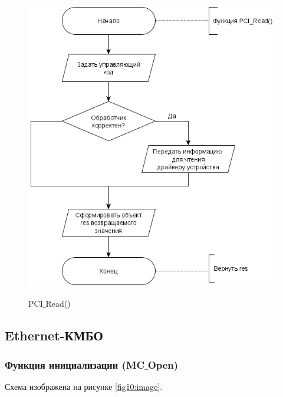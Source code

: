 	\begin{figure}[ph!]
		\centering
		\begin{center}
			{\includegraphics[scale=0.5]{schemes/pci_read.png}}
			\caption{PCI$\_$Read()}
			\label{fig9:image}
		\end{center}
	\end{figure}

	\subsection{Ethernet-КМБО}
	\subsubsection{Функция инициализации (MC$\_$Open)}
	
	Схема изображена на рисунке \ref{fig10:image}.
	
